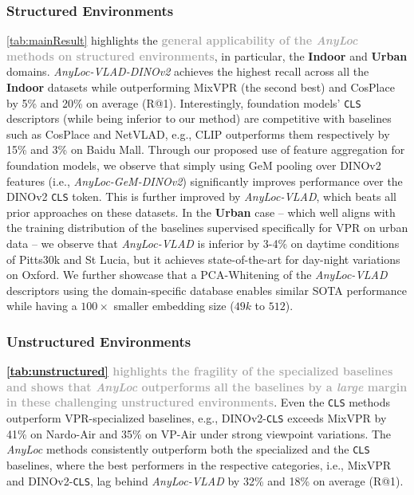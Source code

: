 \documentclass[letterpaper, 10 pt, conference]{ieeeconf}  \fi
\newcommand{\urban}[1]{\textbf{\textcolor{OutdoorDark}{Urban}}}
\newcommand{\indoor}[1]{\textbf{\textcolor{IndoorDark}{Indoor}}}
\newcommand{\highlight}[1]{\textcolor{darkgray}{\textbf{#1}}}
\newcommand{\coolname}{\textit{AnyLoc}}
\newcommand{\coolagg}[2]{\textit{AnyLoc-{#1}-{#2}}}
\newcommand{\coolaggshort}[1]{\textit{AnyLoc-{#1}}}
\newcommand{\dinovtwo}{\mbox{DINOv2}}
\begin{document}
\subsubsection{Structured Environments}

\cref{tab:mainResult} highlights the \highlight{general applicability of the \coolname{} methods on structured environments}, in particular, the \indoor{} and \urban{} domains.
\coolagg{VLAD}{\dinovtwo{}} achieves the highest recall across all the \indoor{} datasets while outperforming MixVPR (the second best) and CosPlace by 5\% and 20\% on average (R@1).
Interestingly, foundation models' \texttt{CLS} descriptors (while being inferior to our method) are competitive with baselines such as CosPlace and NetVLAD, e.g., CLIP outperforms them respectively by 15\% and 3\% on Baidu Mall.
Through our proposed use of feature aggregation for foundation models, we observe that simply using GeM pooling over \dinovtwo{} features (i.e., \coolagg{GeM}{\dinovtwo{}}) significantly improves performance over the \dinovtwo{} \texttt{CLS} token.
This is further improved by \coolaggshort{VLAD}, which beats all prior approaches on these datasets.
In the \urban{} case -- which well aligns with the training distribution of the baselines supervised specifically for VPR on urban data -- we observe that \coolaggshort{VLAD} is inferior by 3-4\% on daytime conditions of Pitts30k and St Lucia, but it achieves state-of-the-art for day-night variations on Oxford.
We further showcase that a PCA-Whitening of the \coolaggshort{VLAD} descriptors using the domain-specific database enables similar SOTA performance while having a $100 \times$ smaller embedding size ($49k$ to $512$).

\subsubsection{Unstructured Environments}

\highlight{\cref{tab:unstructured} highlights the fragility of the specialized baselines and shows that \coolname{} outperforms all the baselines by a \textit{large} margin in these challenging unstructured environments}. 
Even the \texttt{CLS} methods outperform VPR-specialized baselines, e.g., \dinovtwo{}-\texttt{CLS} exceeds MixVPR by 41\% on Nardo-Air and 35\% on VP-Air under strong viewpoint variations.
The \coolname{} methods consistently outperform both the specialized and the \texttt{CLS} baselines, where the best performers in the respective categories, i.e.,  MixVPR and \dinovtwo{}-\texttt{CLS}, lag behind \coolaggshort{VLAD} by 32\% and 18\% on average (R@1).
\end{document}
